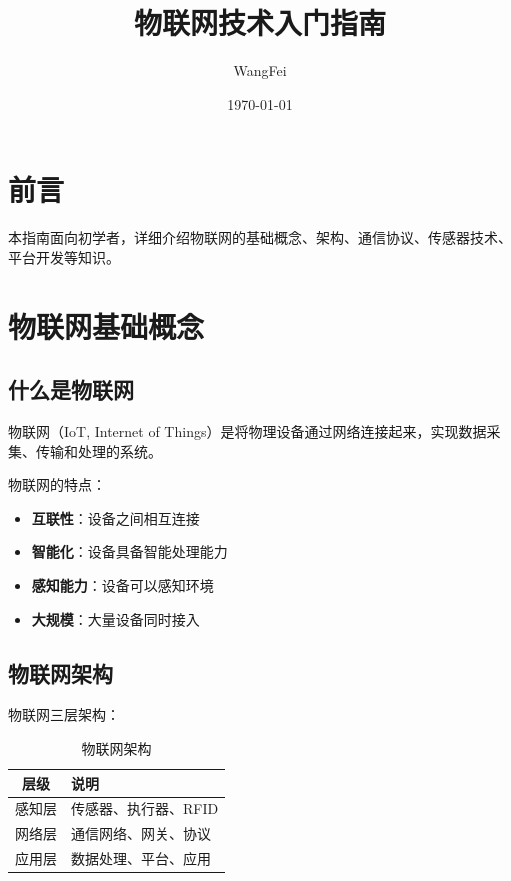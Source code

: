 \documentclass[12pt,UTF8]{ctexbook}
\title{\heiti\zihao{0} 物联网技术入门指南}
\author{WangFei}
\date{\today}
\begin{document}
\maketitle
\tableofcontents

\frontmatter
\chapter{前言}

本指南面向初学者，详细介绍物联网的基础概念、架构、通信协议、传感器技术、平台开发等知识。

\mainmatter

\chapter{物联网基础概念}
\label{chap:iot_basics}

\section{什么是物联网}
\label{sec:what_is_iot}

物联网（IoT, Internet of Things）是将物理设备通过网络连接起来，实现数据采集、传输和处理的系统。

物联网的特点：
\begin{itemize}
    \item \textbf{互联性}：设备之间相互连接
    \item \textbf{智能化}：设备具备智能处理能力
    \item \textbf{感知能力}：设备可以感知环境
    \item \textbf{大规模}：大量设备同时接入
\end{itemize}

\section{物联网架构}
\label{sec:iot_architecture}

物联网三层架构：
\begin{table}[htbp]
    \centering
    \caption{物联网架构}
    \begin{tabular}{|c|p{8cm}|}
        \hline
        \textbf{层级} & \textbf{说明} \\
        \hline
        感知层 & 传感器、执行器、RFID \\
        \hline
        网络层 & 通信网络、网关、协议 \\
        \hline
        应用层 & 数据处理、平台、应用 \\
        \hline
    \end{tabular}
\end{table}
\end{document}
